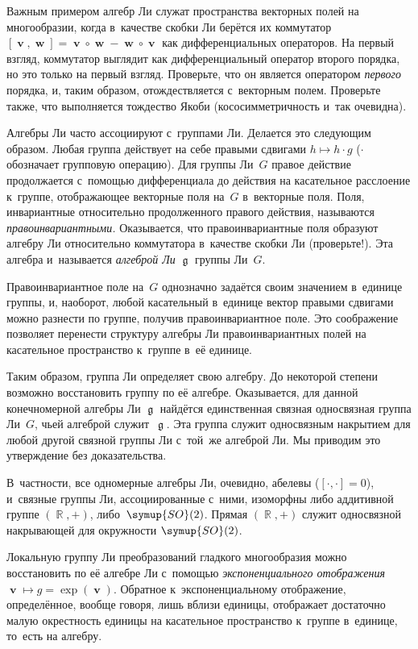 \documentclass[a4paper,11pt]{article}
\theoremstyle{definition}
\begin{document}
Важным примером алгебр Ли служат пространства векторных полей на многообразии,
когда в~качестве скобки Ли берётся их коммутатор
$[\mbfv,\mbfw]=\mbfv\circ\mbfw-\mbfw\circ\mbfv$ как дифференциальных операторов.
На первый взгляд, коммутатор выглядит как дифференциальный оператор второго
порядка, но это только на первый взгляд. Проверьте, что он является оператором
\emph{первого\/} порядка, и, таким образом, отождествляется с~векторным полем.
Проверьте также, что выполняется тождество Якоби (кососимметричность и~так
очевидна).

Алгебры Ли часто ассоциируют с~группами Ли. Делается это следующим образом.
Любая группа действует на себе правыми сдвигами $h\mapsto h\cdot g$ ($\cdot$
обозначает групповую операцию). Для группы Ли~$G$ правое действие продолжается
с~помощью дифференциала до действия на касательное расслоение к~группе,
отображающее векторные поля на~$G$ в~векторные поля. Поля, инвариантные
относительно продолженного правого действия, называются
\emph{правоинвариантными.} Оказывается, что правоинвариантные поля образуют
алгебру Ли относительно коммутатора в~качестве скобки Ли (проверьте!). Эта
алгебра и~называется \emph{алгеброй Ли\/} $\mfrakg$ группы Ли~$G$.

Правоинвариантное поле на~$G$ однозначно задаётся своим значением в~единице
группы, и, наоборот, любой касательный в~единице вектор правыми сдвигами можно
разнести по группе, получив правоинвариантное поле. Это соображение позволяет
перенести структуру алгебры Ли правоинвариантных полей на касательное
пространство к~группе в~её единице.

Таким образом, группа Ли определяет свою алгебру. До некоторой степени возможно
восстановить группу по её алгебре. Оказывается, для данной конечномерной
алгебры Ли $\mfrakg$ найдётся единственная связная односвязная группа Ли~$G$,
чьей алгеброй служит~$\mfrakg$. Эта группа служит односвязным накрытием для
любой другой связной группы Ли с~той~же алгеброй Ли. Мы приводим это
утверждение без доказательства.

В~частности, все одномерные алгебры Ли, очевидно, абелевы ($[\cdot,\cdot]=0$),
и~связные группы Ли, ассоциированные с~ними, изоморфны либо аддитивной группе
$(\BbbR,+)$, либо~$\symup{SO}(2)$. Прямая $(\BbbR,+)$ служит односвязной
накрывающей для окружности $\symup{SO}(2)$.

Локальную группу Ли преобразований гладкого многообразия можно восстановить по
её алгебре Ли с~помощью \emph{экспоненциального отображения\/}
$\mbfv\mapsto g=\exp(\mbfv)$. Обратное к~экспоненциальному отображение,
определённое, вообще говоря, лишь вблизи единицы, отображает достаточно малую
окрестность единицы на касательное пространство к~группе в~единице, то~есть на
алгебру.
\end{document}
